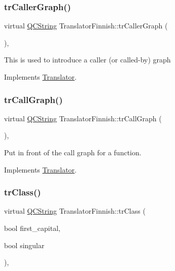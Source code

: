 \subsubsection{\texorpdfstring{trCallerGraph()}{trCallerGraph()}}
{\footnotesize\ttfamily virtual \mbox{\hyperlink{class_q_c_string}{Q\+C\+String}} Translator\+Finnish\+::tr\+Caller\+Graph (\begin{DoxyParamCaption}{ }\end{DoxyParamCaption})\hspace{0.3cm}{\ttfamily [inline]}, {\ttfamily [virtual]}}

This is used to introduce a caller (or called-\/by) graph 

Implements \mbox{\hyperlink{class_translator}{Translator}}.

\mbox{\label{class_translator_finnish_acf2dd05c7cc01c9fce435e1cc956f166}} 
\subsubsection{\texorpdfstring{trCallGraph()}{trCallGraph()}}
{\footnotesize\ttfamily virtual \mbox{\hyperlink{class_q_c_string}{Q\+C\+String}} Translator\+Finnish\+::tr\+Call\+Graph (\begin{DoxyParamCaption}{ }\end{DoxyParamCaption})\hspace{0.3cm}{\ttfamily [inline]}, {\ttfamily [virtual]}}

Put in front of the call graph for a function. 

Implements \mbox{\hyperlink{class_translator}{Translator}}.

\mbox{\label{class_translator_finnish_ac134b32cb7ab241721db6e6af6359923}} 
\subsubsection{\texorpdfstring{trClass()}{trClass()}}
{\footnotesize\ttfamily virtual \mbox{\hyperlink{class_q_c_string}{Q\+C\+String}} Translator\+Finnish\+::tr\+Class (\begin{DoxyParamCaption}\item[{bool}]{first\+\_\+capital,  }\item[{bool}]{singular }\end{DoxyParamCaption})\hspace{0.3cm}{\ttfamily [inline]}, {\ttfamily [virtual]}}

